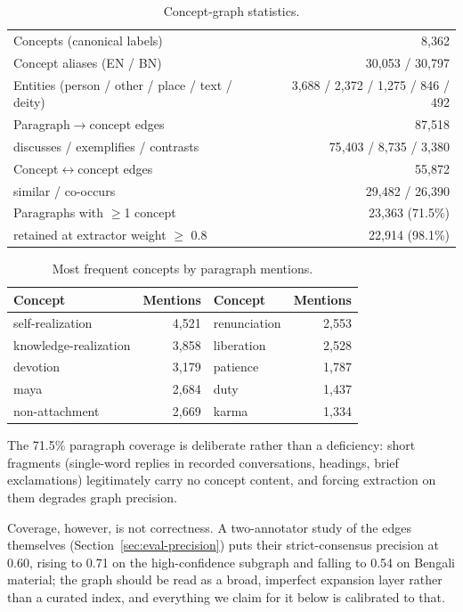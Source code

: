 \documentclass[pdflatex,sn-mathphys-num]{sn-jnl}
\begin{document}
\begin{table}[t]
\centering
\caption{Concept-graph statistics.}
\label{tab:graph}
\begin{tabular}{lr}
\toprule
Concepts (canonical labels) & 8{,}362\\
Concept aliases (EN / BN) & 30{,}053 / 30{,}797\\
Entities (person / other / place / text / deity) & 3{,}688 / 2{,}372 / 1{,}275 / 846 / 492\\
Paragraph$\to$concept edges & 87{,}518\\
\quad discusses / exemplifies / contrasts & 75{,}403 / 8{,}735 / 3{,}380\\
Concept$\leftrightarrow$concept edges & 55{,}872\\
\quad similar / co-occurs & 29{,}482 / 26{,}390\\
Paragraphs with $\geq$1 concept & 23{,}363 (71.5\%)\\
\quad retained at extractor weight $\geq$ 0.8 & 22{,}914 (98.1\%)\\
\bottomrule
\end{tabular}
\end{table}

\begin{table}[t]
\centering
\caption{Most frequent concepts by paragraph mentions.}
\label{tab:topconcepts}
\begin{tabular}{lr@{\qquad}lr}
\toprule
Concept & Mentions & Concept & Mentions\\
\midrule
self-realization      & 4{,}521 & renunciation & 2{,}553\\
knowledge-realization & 3{,}858 & liberation   & 2{,}528\\
devotion              & 3{,}179 & patience     & 1{,}787\\
maya                  & 2{,}684 & duty         & 1{,}437\\
non-attachment        & 2{,}669 & karma        & 1{,}334\\
\bottomrule
\end{tabular}
\end{table}

The 71.5\% paragraph coverage is deliberate rather than a deficiency:
short fragments (single-word replies in recorded conversations, headings,
brief exclamations) legitimately carry no concept content, and forcing
extraction on them degrades graph precision.

Coverage, however, is not correctness. A two-annotator study of the
edges themselves (Section~\ref{sec:eval-precision}) puts their
strict-consensus precision at 0.60, rising to 0.71 on the
high-confidence subgraph and falling to 0.54 on Bengali material; the
graph should be read as a broad, imperfect expansion layer rather than a
curated index, and everything we claim for it below is calibrated to
that.
\end{document}
